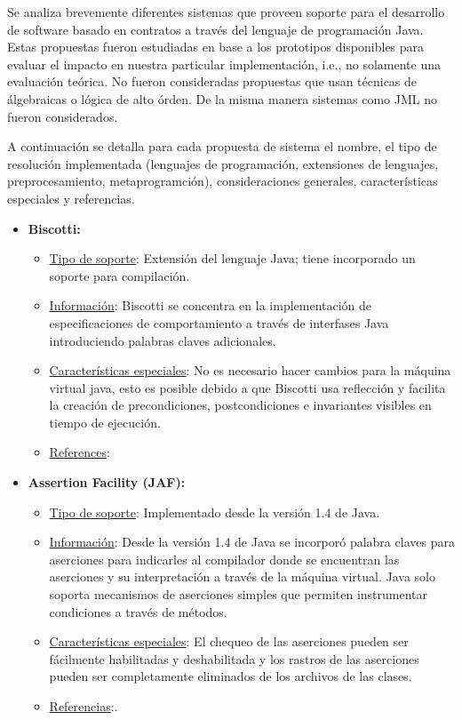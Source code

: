 Se analiza brevemente diferentes sistemas que proveen soporte para el
desarrollo de software basado en contratos a través del lenguaje de
programación Java. Estas propuestas fueron estudiadas en base a los prototipos disponibles para evaluar el impacto en nuestra particular implementación, i.e., no solamente una evaluación teórica. No fueron consideradas propuestas que usan técnicas de álgebraicas o lógica de alto órden. De la misma manera sistemas como JML \cite{Leavens99} no fueron considerados. 

A continuación se detalla para cada propuesta de sistema el nombre, el tipo de resolución implementada (lenguajes de programación, extensiones de
lenguajes, preprocesamiento, metaprogramción), consideraciones generales,
características especiales y referencias.

\begin{itemize}

\item \textbf{Biscotti:}


\begin{itemize}
\item \underline{Tipo de soporte}: Extensión del lenguaje Java; tiene
incorporado un
soporte para compilación.
\item \underline{Información}: Biscotti se concentra en la implementación de
especificaciones de comportamiento a través de interfases Java introduciendo
palabras claves adicionales. 

\item \underline{Características especiales}: No es necesario hacer cambios para
la
máquina virtual java, esto es posible debido a que Biscotti usa reflección y
facilita la creación de precondiciones, postcondiciones e invariantes visibles
en tiempo de ejecución.
\item \underline{References}: \cite{Cicalese99}
\end{itemize}

\item \textbf{Assertion Facility (JAF):}

\begin{itemize}
\item \underline{Tipo de soporte}: Implementado desde la versión 1.4 de Java.
\item \underline{Información}: Desde la versión 1.4 de Java se incorporó palabra
claves para aserciones para indicarles al compilador donde se encuentran
las aserciones y su interpretación a través de la máquina virtual. Java solo
soporta mecanismos de aserciones simples que permiten instrumentar condiciones
a través de métodos.
\item \underline{Características especiales}: El chequeo de las aserciones
pueden ser
fácilmente habilitadas y deshabilitada y los rastros de las aserciones pueden
ser completamente eliminados de los archivos de las clases. 
\item \underline{Referencias}:\cite{Sun02,Rogers01a,Rogers01b}.
\end{itemize}



\end{itemize}
